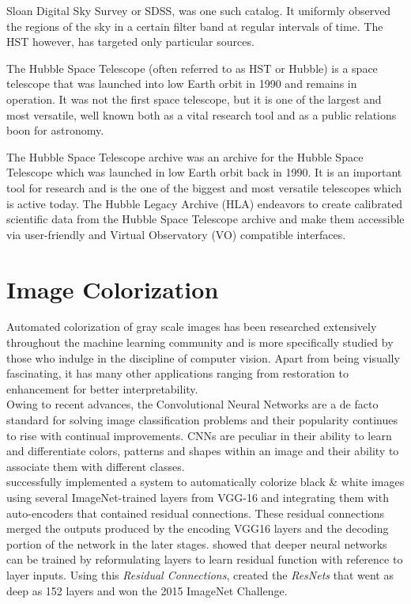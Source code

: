 \documentclass[12pt, letterpaper]{article}
\begin{document}
Sloan Digital Sky Survey or SDSS, was one such catalog. It uniformly observed the regions of the sky in a certain filter band at regular intervals of time. The HST however, has targeted only particular sources.

The Hubble Space Telescope (often referred to as HST or Hubble) is a space telescope that was launched into low Earth orbit in 1990 and remains in operation. It was not the first space telescope, but it is one of the largest and most versatile, well known both as a vital research tool and as a public relations boon for astronomy.

The Hubble Space Telescope archive was an archive for the Hubble Space Telescope which was launched in low Earth orbit back in 1990. It is an important tool for research and is the one of the biggest and most versatile telescopes which is active today.
The Hubble Legacy Archive (HLA) endeavors to create calibrated scientific data from the Hubble Space Telescope archive and make them accessible via user-friendly and Virtual Observatory (VO) compatible interfaces. 

	\section{Image Colorization}
		\hspace*{0.25 in} Automated colorization of gray scale images has been researched extensively throughout the machine learning community and is more specifically studied by those who indulge in the discipline of computer vision. Apart from being visually fascinating, it has many other applications ranging from restoration to enhancement for better interpretability. \\
		\hspace*{0.25 in}Owing to recent advances, the Convolutional Neural Networks are a de facto standard for solving image classification problems and their popularity continues to rise with continual improvements. CNNs are peculiar in their ability to learn and differentiate colors, patterns and shapes within an image and their ability to associate them with different classes. \\
		\hspace*{0.25 in} \cite{dahl2016automatic} successfully implemented a system to automatically colorize black \& white images using several ImageNet-trained layers from VGG-16 \cite{simonyan2015deep} and integrating them with auto-encoders that contained residual connections. These residual connections merged the outputs produced by the encoding VGG16 layers and the decoding portion of the network in the later stages. \cite{he2015deep} showed that deeper neural networks can be trained by reformulating layers to learn residual function with reference to layer inputs. Using this \textit{Residual Connections}, \cite{he2015deep} created the \textit{ResNets} that went as deep as 152 layers and won the 2015 ImageNet Challenge. 
		
\renewcommand\bibname{References}


\end{document}
